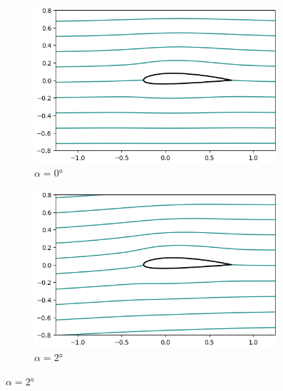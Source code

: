 \documentclass[letterpaper, openright, 12pt]{book}
\begin{document}
    \begin{figure}
        \centering
        \begin{subfigure}[c]{0.48\textwidth}
            \includegraphics[keepaspectratio, width=0.99\textwidth]
                {./img/potential_flow_2412_stream_0}
            \caption{$\alpha = 0\si{\degree}$}
            \label{fig:potential_flow_2412_stream_0}
        \end{subfigure}
        \hfill
        \begin{subfigure}[c]{0.48\textwidth}
            \includegraphics[keepaspectratio, width=0.99\textwidth]
                {./img/potential_flow_2412_stream_2}
            \caption{$\alpha = 2\si{\degree}$}
            \label{fig:potential_flow_2412_stream_2}
        \end{subfigure}


\end{figure}
\end{document}
